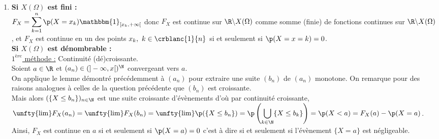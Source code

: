 \documentclass[8pt]{book}
\begin{document}
\begin{enumerate}
		$F_X$ est continue à droite en $x$ par caractérisation séquentielle.\\\\
		\underline{$2^{nd}$ méthode :} Série de fonctions.\\
		On réutilise l'expression $F_X=\displaystyle\sum\limits_{n\in \N}\p(X=s_n)\mathbbm{1}_{[s_n,+\infty[}$. On a déjà montré la convergence normale, et donc uniforme, sur $\R$ de la série $\displaystyle\sum\limits_{n\in \N}\p(X=s_n)\mathbbm{1}_{[s_n,+\infty[}$. De plus, quel que soit $n\in \N,\ \p(X=s_n)\mathbbm{1}_{[s_n,+\infty[}$ est continue à droite en tout point de $\R$. Donc par théorème de transfert, $F_X$ est continue à droite en tout point de $\R$.
		\item \textbf{Si $X(\Omega)$ est fini :}\\
		$F_X=\displaystyle\sum\limits_{k=1}^n\p(X=x_k)\mathbbm{1}_{[x_k,+\infty[}$ donc $F_X$ est continue sur $\R\backslash X(\Omega)$ comme somme (finie) de fonctions continues sur $\R\backslash X(\Omega)$, et $F_X$ est continue en un des points $x_k,\ k\in\crblanc{1}{n}$ si et seulement si $\p(X=x=k)=0$.\\
		\textbf{Si $X(\Omega)$ est dénombrable :}\\
		\underline{$1^{ère}$ méthode :} Continuité (dé)croissante.\\
		Soient $a\in \R$ et $(a_n)\in (]-\infty,x[)^\N$ convergeant vers $a$.\\
		On applique le lemme démontré précédemment à $(a_n)$ pour extraire une suite $(b_n)$ de $(a_n)$ monotone. On remarque pour des raisons analogues à celles de la question précédente que $(b_n)$ est croissante.\\
		Mais alors $(\{X\leq b_n\})_{n\in \N}$ est une suite croissante d'évènements d'où par continuité croissante,\\
		$\unfty{\lim}F_X(a_n)=\unfty{\lim}F_X(b_n)=\unfty{\lim}\p(\{X\leq b_n\})=\p\left(\displaystyle\bigcup\limits_{k\in \N}\{X\leq b_k\}\right)=\p(X<a)=F_X(a)-\p(X=a)$.\\
		Ainsi, $F_X$ est continue en $a$ si et seulement si $\p(X=a)=0$ c'est à dire si et seulement si l'évènement $\{X=a\}$ est négligeable.
	\end{enumerate}
	
\end{document}
